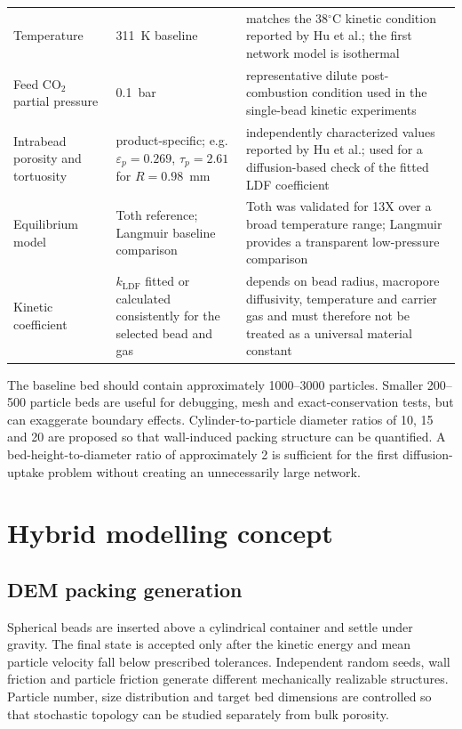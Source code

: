 \documentclass[12pt,a4paper]{article}
\begin{document}
\begin{table}[!htbp]
\begin{tabular}{P{3.25cm}P{3.1cm}P{6.45cm}}
Temperature & 311~K baseline & matches the 38$^\circ$C kinetic condition reported by Hu et al.; the first network model is isothermal \\
Feed CO$_2$ partial pressure & 0.1~bar & representative dilute post-combustion condition used in the single-bead kinetic experiments \\
Intrabead porosity and tortuosity & product-specific; e.g. $\varepsilon_p=0.269$, $\tau_p=2.61$ for $R=0.98$~mm & independently characterized values reported by Hu et al.; used for a diffusion-based check of the fitted LDF coefficient \\
Equilibrium model & Toth reference; Langmuir baseline comparison & Toth was validated for 13X over a broad temperature range; Langmuir provides a transparent low-pressure comparison \\
Kinetic coefficient & $k_{\mathrm{LDF}}$ fitted or calculated consistently for the selected bead and gas & depends on bead radius, macropore diffusivity, temperature and carrier gas and must therefore not be treated as a universal material constant \\
\bottomrule
\end{tabular}
\end{table}

The baseline bed should contain approximately 1000--3000 particles. Smaller
200--500 particle beds are useful for debugging, mesh and exact-conservation
tests, but can exaggerate boundary effects. Cylinder-to-particle diameter ratios
of 10, 15 and 20 are proposed so that wall-induced packing structure can be
quantified. A bed-height-to-diameter ratio of approximately 2 is sufficient for
the first diffusion-uptake problem without creating an unnecessarily large
network.

\section{Hybrid modelling concept}

\subsection{DEM packing generation}

Spherical beads are inserted above a cylindrical container and settle under
gravity. The final state is accepted only after the kinetic energy and mean
particle velocity fall below prescribed tolerances. Independent random seeds,
wall friction and particle friction generate different mechanically realizable
structures. Particle number, size distribution and target bed dimensions are
controlled so that stochastic topology can be studied separately from bulk
porosity.
\end{document}
